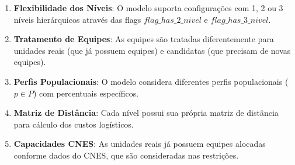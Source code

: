 \documentclass{article}
\begin{document}
\begin{enumerate}
    \item \textbf{Flexibilidade dos Níveis}: O modelo suporta configurações com 1, 2 ou 3 níveis hierárquicos através das flags $flag\_has\_2\_nivel$ e $flag\_has\_3\_nivel$.
    
    \item \textbf{Tratamento de Equipes}: As equipes são tratadas diferentemente para unidades reais (que já possuem equipes) e candidatas (que precisam de novas equipes).
    
    \item \textbf{Perfis Populacionais}: O modelo considera diferentes perfis populacionais ($p \in P$) com percentuais específicos.
    
    \item \textbf{Matriz de Distância}: Cada nível possui sua própria matriz de distância para cálculo dos custos logísticos.
    
    \item \textbf{Capacidades CNES}: As unidades reais já possuem equipes alocadas conforme dados do CNES, que são consideradas nas restrições.
\end{enumerate}
\end{document}

